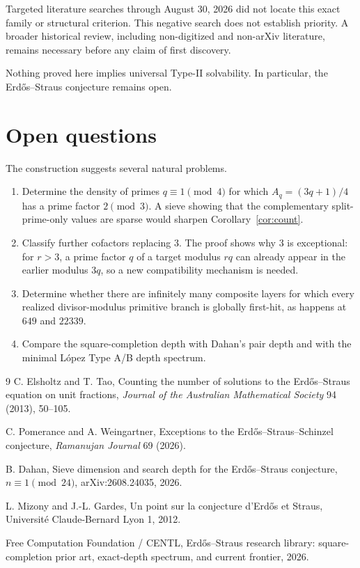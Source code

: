 \documentclass[11pt]{article}
\theoremstyle{definition}
\begin{document}
Targeted literature searches through August 30, 2026 did not locate this exact family or structural criterion.  This negative search does not establish priority.  A broader historical review, including non-digitized and non-arXiv literature, remains necessary before any claim of first discovery.

Nothing proved here implies universal Type-II solvability.  In particular, the Erd\H{o}s--Straus conjecture remains open.

\section{Open questions}
The construction suggests several natural problems.
\begin{enumerate}
\item Determine the density of primes $q\equiv1\pmod4$ for which $A_q=(3q+1)/4$ has a prime factor $2\pmod3$.  A sieve showing that the complementary split-prime-only values are sparse would sharpen Corollary~\ref{cor:count}.
\item Classify further cofactors replacing $3$.  The proof shows why $3$ is exceptional: for $r>3$, a prime factor $q$ of a target modulus $rq$ can already appear in the earlier modulus $3q$, so a new compatibility mechanism is needed.
\item Determine whether there are infinitely many composite layers for which every realized divisor-modulus primitive branch is globally first-hit, as happens at $649$ and $22339$.
\item Compare the square-completion depth with Dahan's pair depth and with the minimal López Type A/B depth spectrum.
\end{enumerate}

\begin{thebibliography}{9}
C. Elsholtz and T. Tao,
Counting the number of solutions to the Erd\H{o}s--Straus equation on unit fractions,
\emph{Journal of the Australian Mathematical Society} 94 (2013), 50--105.

C. Pomerance and A. Weingartner,
Exceptions to the Erd\H{o}s--Straus--Schinzel conjecture,
\emph{Ramanujan Journal} 69 (2026).

B. Dahan,
Sieve dimension and search depth for the Erd\H{o}s--Straus conjecture, $n\equiv1\pmod{24}$,
arXiv:2608.24035, 2026.

L. Mizony and J.-L. Gardes,
Un point sur la conjecture d'Erd\H{o}s et Straus,
Universit\'e Claude-Bernard Lyon 1, 2012.

Free Computation Foundation / CENTL,
Erd\H{o}s--Straus research library: square-completion prior art, exact-depth spectrum, and current frontier,
2026.
\end{thebibliography}
\end{document}
